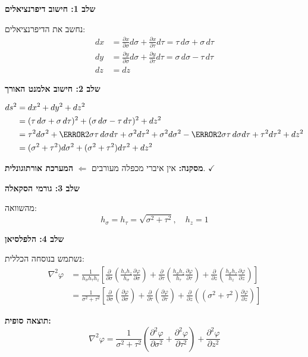 \documentclass{article}
\begin{document}
\begin{solutionbox}
\textbf{שלב 1: חישוב דיפרנציאלים}

נחשב את הדיפרנציאלים:
\begin{align*}
dx &= \frac{\partial x}{\partial\sigma}d\sigma + \frac{\partial x}{\partial\tau}d\tau = \tau\, d\sigma + \sigma\, d\tau \\
dy &= \frac{\partial y}{\partial\sigma}d\sigma + \frac{\partial y}{\partial\tau}d\tau = \sigma\, d\sigma - \tau\, d\tau \\
dz &= dz
\end{align*}

\textbf{שלב 2: חישוב אלמנט האורך}

\begin{align*}
ds^2 &= dx^2 + dy^2 + dz^2 \\
&= (\tau\, d\sigma + \sigma\, d\tau)^2 + (\sigma\, d\sigma - \tau\, d\tau)^2 + dz^2 \\
&= \tau^2 d\sigma^2 + \cancel{2\sigma\tau\, d\sigma d\tau} + \sigma^2 d\tau^2 + \sigma^2 d\sigma^2 - \cancel{2\sigma\tau\, d\sigma d\tau} + \tau^2 d\tau^2 + dz^2 \\
&= (\sigma^2 + \tau^2)d\sigma^2 + (\sigma^2 + \tau^2)d\tau^2 + dz^2
\end{align*}

\textbf{מסקנה:} אין איברי מכפלה מעורבים $\Leftarrow$ \textcolor{accentgreen}{\textbf{המערכת אורתוגונלית}}. $\checkmark$

\textbf{שלב 3: גורמי הסקאלה}

מהשוואה:
\[
\boxed{h_\sigma = h_\tau = \sqrt{\sigma^2 + \tau^2}, \quad h_z = 1}
\]

\textbf{שלב 4: הלפלסיאן}

נשתמש בנוסחה הכללית:
\begin{align*}
\nabla^2\varphi &= \frac{1}{h_\sigma h_\tau h_z}\left[\frac{\partial}{\partial\sigma}\left(\frac{h_\tau h_z}{h_\sigma}\frac{\partial\varphi}{\partial\sigma}\right) + \frac{\partial}{\partial\tau}\left(\frac{h_\sigma h_z}{h_\tau}\frac{\partial\varphi}{\partial\tau}\right) + \frac{\partial}{\partial z}\left(\frac{h_\sigma h_\tau}{h_z}\frac{\partial\varphi}{\partial z}\right)\right] \\
&= \frac{1}{\sigma^2+\tau^2}\left[\frac{\partial}{\partial\sigma}\left(\frac{\partial\varphi}{\partial\sigma}\right) + \frac{\partial}{\partial\tau}\left(\frac{\partial\varphi}{\partial\tau}\right) + \frac{\partial}{\partial z}\left((\sigma^2+\tau^2)\frac{\partial\varphi}{\partial z}\right)\right]
\end{align*}

\textbf{תוצאה סופית:}
\[
\boxed{\nabla^2\varphi = \frac{1}{\sigma^2+\tau^2}\left(\frac{\partial^2\varphi}{\partial\sigma^2} + \frac{\partial^2\varphi}{\partial\tau^2}\right) + \frac{\partial^2\varphi}{\partial z^2}}
\]
\end{solutionbox}
\end{document}
